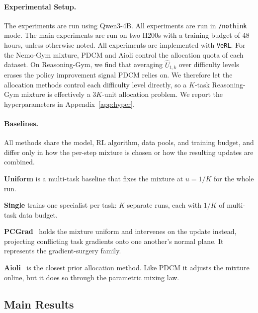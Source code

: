 \paragraph{Experimental Setup.} The experiments are run using Qwen3-4B. All experiments are run in \texttt{/nothink} mode. The main experiments are run on two H200s with a training budget of 48 hours, unless otherwise noted. All experiments are implemented with \texttt{VeRL}.
For the Nemo-Gym mixture, PDCM and Aioli control the allocation quota of each dataset. On Reasoning-Gym, we find that averaging $\widehat U_{t,k}$ over difficulty levels erases
the policy improvement signal PDCM relies on. We
therefore let the allocation methods control each difficulty level directly, so a $K$-task
Reasoning-Gym mixture is effectively a $3K$-unit allocation problem. We report the hyperparameters in Appendix~\ref{app:hyper}.

\vspace{-0.3cm}
\paragraph{Baselines.} All methods share the model, RL algorithm, data pools, and training budget, and differ only in
how the per-step mixture is chosen or how the resulting updates are combined.

\textbf{Uniform} is a multi-task baseline that fixes the mixture at $u=1/K$ for the whole run.

\textbf{Single} trains one specialist per task: $K$ separate runs, each with $1/K$ of
multi-task data budget.

\textbf{PCGrad}~\citep{pcgrad2020} holds the mixture uniform and intervenes on the update
instead, projecting conflicting task gradients onto one another's normal plane. It represents
the gradient-surgery family.

\textbf{Aioli}~\citep{chen2025aioli} is the closest prior allocation method. Like PDCM it
adjusts the mixture online, but it does so through the parametric mixing law.

\vspace{-0.05in}
\subsection{Main Results}
\vspace{-0.05in}

